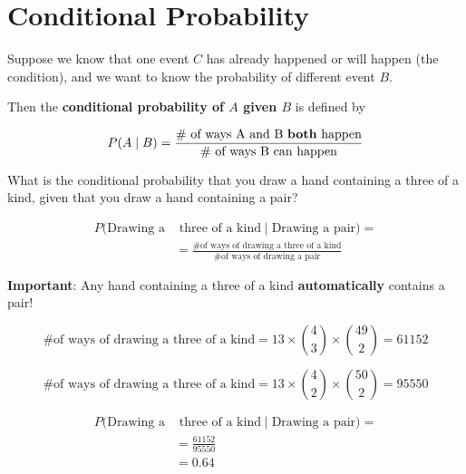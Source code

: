 \section{Conditional Probability}

%
\begin{frame}

Suppose we know that one event $C$ has already happened or will happen (the
condition), and we want to know the probability of different event $B$.

Then the \textbf{conditional probability of $A$ given $B$} is defined by

$$ P(A \mid B) = \frac{\text{\# of ways A and B \textbf{both} happen}}{\text{\#
of ways B can happen}} $$

\end{frame}
%

%
\begin{frame}

What is the conditional probability that you draw a hand containing a three of a
kind, given that you draw a hand containing a pair?

\begin{align*}
P(\text{Drawing a} & \text{ three of a kind} \mid \text{Drawing a pair}) = \\ 
&= \frac{\text{\# of ways of drawing a three of a kind}}{\text{\# of ways of
drawing a pair}}
\end{align*}

\textbf{Important}: Any hand containing a three of a kind \textbf{automatically}
contains a pair!

\end{frame}
%

%
\begin{frame}

$$ \text{\# of ways of drawing a three of a kind} = 13 \times {{4}\choose{3}}
\times {{49}\choose{2}} = 61152 $$

$$ \text{\# of ways of drawing a three of a kind} = 13 \times {{4}\choose{2}}
\times {{50}\choose{2}} = 95550 $$

\end{frame}
%

%
\begin{frame}

\begin{align*}
P(\text{Drawing a} & \text{ three of a kind} \mid \text{Drawing a pair}) = \\ 
&= \frac{61152}{95550} \\
&= 0.64
\end{align*}

\end{frame}
%

